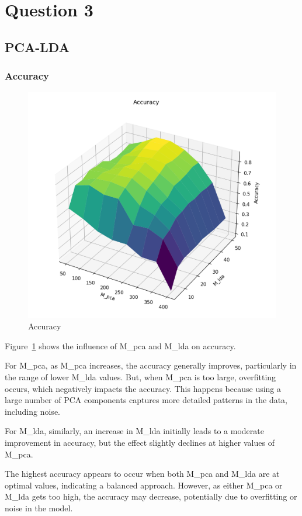 \section{Question 3} 
\subsection{PCA-LDA}
\subsubsection{Accuracy}

\begin{figure}[h]
	\centering
	\includegraphics[width=0.8\linewidth]{Ressources/Q3_accuracy1.png}
	
	\caption{Accuracy}
	\label{fig:Q3_accuracy}
\end{figure}

Figure~\ref{fig:Q3_accuracy} shows the influence of M\_pca and M\_lda on accuracy.

For M\_pca, as M\_pca increases, the accuracy generally improves, particularly in the range of lower M\_lda values. But, when M\_pca is too large, overfitting occurs, which negatively impacts the accuracy. This happens because using a large number of PCA components captures more detailed patterns in the data, including noise.

For M\_lda, similarly, an increase in M\_lda initially leads to a moderate improvement in accuracy, but the effect slightly declines at higher values of M\_pca.

The highest accuracy appears to occur when both M\_pca and M\_lda are at optimal values, indicating a balanced approach. However, as either M\_pca or M\_lda gets too high, the accuracy may decrease, potentially due to overfitting or noise in the model.
